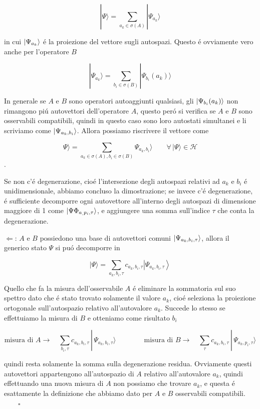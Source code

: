 $$|\Psi\rangle=\sum_{a_{k}\in\sigma(A)}|\Psi_{a_{k}}\rangle$$

in cui $\ket{\Psi_{a_k}}$ \'e la proiezione del vettore sugli autospazi. Questo \'e ovviamente vero anche per l'operatore $B$

$$|\Psi_{a_{k}}\rangle=\sum_{b_{i}\in\sigma(B)}|\Psi_{b_{i}}(a_{k})\rangle$$

In generale se $A$ e $B$ sono operatori autoaggiunti qualsiasi, gli $\ket{\Psi_{b_i}(a_k)}$ non rimangono pi\'u autovettori dell'operatore $A$, questo per\'o si verifica se $A$ e $B$ sono osservabili compatibili, quindi in questo caso sono loro autostati simultanei e li scriviamo come $\ket{\Psi_{a_k, b_i}}$. Allora possiamo riscrivere il vettore come

$$\Psi\rangle=\sum_{a_{k}\in\sigma(A),b_{i}\in\sigma(B)}\Psi_{a_{k},b_{i}}\rangle\qquad\forall\,|\Psi\rangle\in\mathcal{H}$$.  

Se non c'\'e degenerazione, cio\'e l'intersezione degli autospazi relativi ad $a_k$ e $b_i$ \'e unidimensionale, abbiamo concluso la dimostrazione; se invece c'\'e degenerazione, \'e sufficiente decomporre ogni autovettore all'interno degli autospazi di dimensione maggiore di 1 come $\ket{\Psi\Phi_{a_, p_i, \tau}}$, e aggiungere una somma sull'indice $\tau$ che conta la degenerazione.

$\Longleftarrow$: $A$ e $B$ possiedono una base di autovettori comuni $\ket{\Psi_{a_k, b_i, \tau}}$, allora il generico stato $\Psi$ si pu\'o decomporre in

$$|\Psi\rangle=\sum_{a_{k},b_{i},\tau}c_{a_{k},b_{i},\tau}\left|\Psi_{a_{k},b_{i},\tau}\right\rangle$$

Quello che fa la misura dell'osservabile $A$ \'e eliminare la sommatoria sul suo spettro dato che \'e stato trovato solamente il valore $a_k$, cio\'e seleziona la proiezione ortogonale sull'autospazio relativo all'autovalore $a_k$. Succede lo stesso se effettuiamo la misura di $B$ e otteniamo come risultato $b_i$

$$\text{misura di } A\to\quad\sum_{b_{i},\tau}c_{a_{k},b_{i},\tau}\,|\,\Psi_{a_{k},b_{i},\tau}\rangle \qquad\qquad \text{misura di } B\to\quad\sum_{\tau}c_{a_{k},b_{i},\tau}\,|\,\Psi_{a_{k},p_{i},\tau}\rangle$$

quindi resta solamente la somma sulla degenerazione residua. Ovviamente questi autovettori appartengono all'autospazio di $A$ relativo all'autovalore $a_k$, quindi effettuando una nuova misura di $A$ non possiamo che trovare $a_k$, e questa \'e esattamente la definizione che abbiamo dato per $A$ e $B$ osservabili compatibili. $\qquad\square$
	
